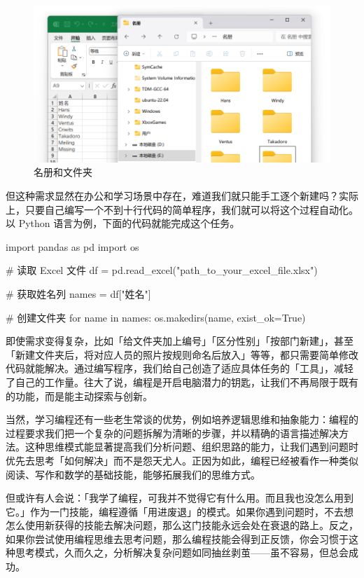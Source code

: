 \begin{figure}[htb!]
  \centering
  \includegraphics[width=.65\textwidth]{assets/surpass/Sheet_and_folders.png}
  \caption{名册和文件夹}
  \label{fig:Sheet_and_folders}
\end{figure}

但这种需求显然在办公和学习场景中存在，难道我们就只能手工逐个新建吗？实际上，只要自己编写一个不到十行代码的简单程序，我们就可以将这个过程自动化。以 Python 语言为例，下面的代码就能完成这个任务。

\begin{MissingVerbatim}[python]
  import pandas as pd
  import os

  # 读取 Excel 文件
  df = pd.read_excel("path_to_your_excel_file.xlsx")

  # 获取姓名列
  names = df["姓名"]

  # 创建文件夹
  for name in names:
      os.makedirs(name, exist_ok=True)
\end{MissingVerbatim}

即使需求变得复杂，比如「给文件夹加上编号」「区分性别」「按部门新建」，甚至「新建文件夹后，将对应人员的照片按规则命名后放入」等等，都只需要简单修改代码就能解决。通过编写程序，我们给自己创造了适应具体任务的「工具」，减轻了自己的工作量。往大了说，编程是开启电脑潜力的钥匙，让我们不再局限于既有的功能，而是能主动探索与创新。

当然，学习编程还有一些老生常谈的优势，例如培养逻辑思维和抽象能力：编程的过程要求我们把一个复杂的问题拆解为清晰的步骤，并以精确的语言描述解决方法。这种思维模式能显著提高我们分析问题、组织思路的能力，让我们遇到问题时优先去思考「如何解决」而不是怨天尤人。正因为如此，编程已经被看作一种类似阅读、写作和数学的基础技能，能够拓展我们的思维方式。

但或许有人会说：「我学了编程，可我并不觉得它有什么用。而且我也没怎么用到它。」作为一门技能，编程遵循「用进废退」的模式。如果你遇到问题时，不去想怎么使用新获得的技能去解决问题，那么这门技能永远会处在衰退的路上。反之，如果你尝试使用编程思维去思考问题，那么编程技能会得到正反馈，你会习惯于这种思考模式，久而久之，分析解决复杂问题如同抽丝剥茧——虽不容易，但总会成功。


